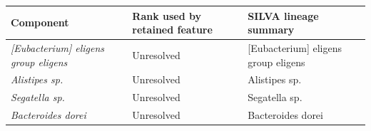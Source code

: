 \begin{center}
\footnotesize
\begin{tabularx}{\textwidth}{@{} l l Y @{}}
\toprule
Component & Rank used by retained feature & SILVA lineage summary
 \\
\midrule
\emph{[Eubacterium] eligens group eligens} & Unresolved & [Eubacterium] eligens group eligens \\
\emph{Alistipes sp.} & Unresolved & Alistipes sp. \\
\emph{Segatella sp.} & Unresolved & Segatella sp. \\
\emph{Bacteroides dorei} & Unresolved & Bacteroides dorei \\
\bottomrule
\end{tabularx}
\end{center}
